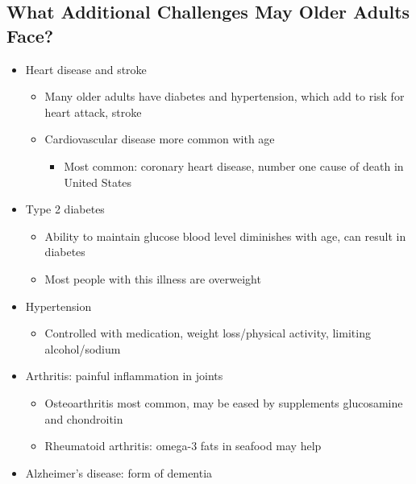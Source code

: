 \documentclass[12pt]{article}
\begin{document}
        \subsection{What Additional Challenges May Older Adults Face?}
            \begin{itemize}
                \item Heart disease and stroke
                    \begin{itemize}
                        \item Many older adults have diabetes and hypertension, which add to risk for heart attack, stroke
                        \item Cardiovascular disease more common with age
                            \begin{itemize}
                                \item Most common: coronary heart disease, number one cause of death in United States
                            \end{itemize}
                    \end{itemize}
                \item Type 2 diabetes
                    \begin{itemize}
                        \item Ability to maintain glucose blood level diminishes with age, can result in diabetes
                        \item Most people with this illness are overweight
                    \end{itemize}
                \item Hypertension
                    \begin{itemize}
                        \item Controlled with medication, weight loss/physical activity, limiting alcohol/sodium
                    \end{itemize}
                \item Arthritis: painful inflammation in joints
                    \begin{itemize}
                        \item Osteoarthritis most common, may be eased by supplements glucosamine and chondroitin
                        \item Rheumatoid arthritis: omega-3 fats in seafood may help
                    \end{itemize}
                \item Alzheimer's disease: form of dementia

\end{itemize}
\end{document}
